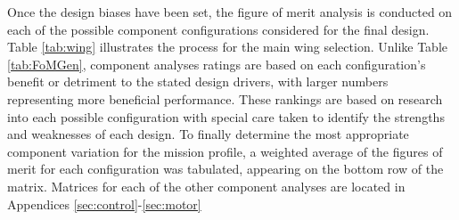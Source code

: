 \documentclass[titlepage]{article}
\begin{document}
\begin{table}[h!]
\caption{Figures of Merit for Aircraft Performance}
\label{tab:FoMGen}
\end{table}

Once the design biases have been set, the figure of merit analysis is conducted on each of the possible component configurations considered for the final design. Table \ref{tab:wing} illustrates the process for the main wing selection. Unlike Table \ref{tab:FoMGen}, component analyses ratings are based on each configuration's benefit or detriment to the stated design drivers, with larger numbers representing more beneficial performance. These rankings are based on research into each possible configuration with special care taken to identify the strengths and weaknesses of each design. To finally determine the most appropriate component variation for the mission profile, a weighted average of the figures of merit for each configuration was tabulated, appearing on the bottom row of the matrix. Matrices for each of the other component analyses are located in Appendices \ref{sec:control}-\ref{sec:motor}
\end{document}
